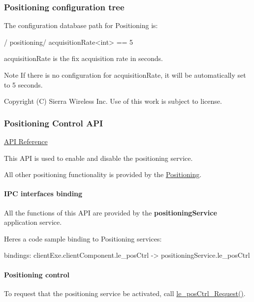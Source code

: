\hypertarget{c_pos_le_pos_configdb}{}\subsubsection{Positioning configuration tree}\label{c_pos_le_pos_configdb}
The configuration database path for Positioning is\+: \begin{DoxyVerb}/
    positioning/
        acquisitionRate<int> == 5
\end{DoxyVerb}



\begin{DoxyItemize}
\item \textquotesingle{}acquisition\+Rate\textquotesingle{} is the fix acquisition rate in seconds.
\end{DoxyItemize}

\begin{DoxyNote}{Note}
If there is no configuration for \textquotesingle{}acquisition\+Rate\textquotesingle{}, it will be automatically set to 5 seconds.
\end{DoxyNote}




Copyright (C) Sierra Wireless Inc. Use of this work is subject to license. \hypertarget{c_posCtrl}{}\subsubsection{Positioning Control A\+P\+I}\label{c_posCtrl}
\hyperlink{le__pos_ctrl__interface_8h}{A\+P\+I Reference}





This A\+P\+I is used to enable and disable the positioning service.

All other positioning functionality is provided by the \hyperlink{c_pos}{Positioning}.\hypertarget{c_pos_ctrl_le_posCtrl_binding}{}\paragraph{I\+P\+C interfaces binding}\label{c_pos_ctrl_le_posCtrl_binding}
All the functions of this A\+P\+I are provided by the {\bfseries positioning\+Service} application service.

Here\textquotesingle{}s a code sample binding to Positioning services\+: \begin{DoxyVerb}bindings:
{
   clientExe.clientComponent.le_posCtrl -> positioningService.le_posCtrl
}
\end{DoxyVerb}
\hypertarget{c_pos_ctrl_le_posCtrl_ctrl}{}\paragraph{Positioning control}\label{c_pos_ctrl_le_posCtrl_ctrl}
To request that the positioning service be activated, call \hyperlink{le__pos_ctrl__interface_8h_ab0522cfb23a7b34863b7bd9475d38255}{le\+\_\+pos\+Ctrl\+\_\+\+Request()}.

